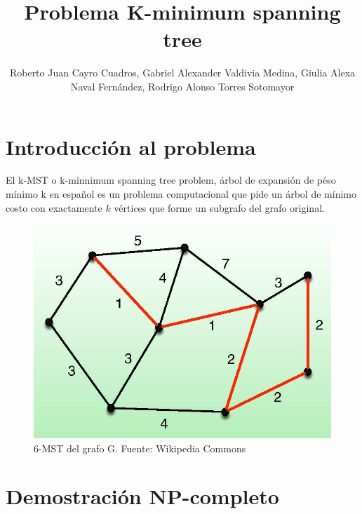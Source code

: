 \documentclass[spanish,12pt]{elsarticle}
\begin{document}
\begin{frontmatter}
\title{Problema K-minimum spanning tree}
\author{Roberto Juan Cayro Cuadros, Gabriel Alexander Valdivia Medina,
Giulia Alexa Naval Fernández, Rodrigo Alonso Torres Sotomayor}
\begin{abstract}
    
\end{abstract}
\address{Universidad Católica San Pablo}

\end{frontmatter}


\section{Introducción al problema}
El k-MST o k-minnimum spanning tree problem, árbol de expansión de péso mínimo k en español es un problema computacional que pide un árbol de mínimo costo con exactamente $k$ vértices que forme un subgrafo del grafo original. \cite{1}\\%
\begin{figure}[h]
    \centering
    \includegraphics[scale=0.5]{images/6-mst.jpg}
    \caption{6-MST del grafo G. Fuente: Wikipedia Commons}
    \label{fig:my_label}
\end{figure}


\section{Demostración NP-completo}
\end{document}
